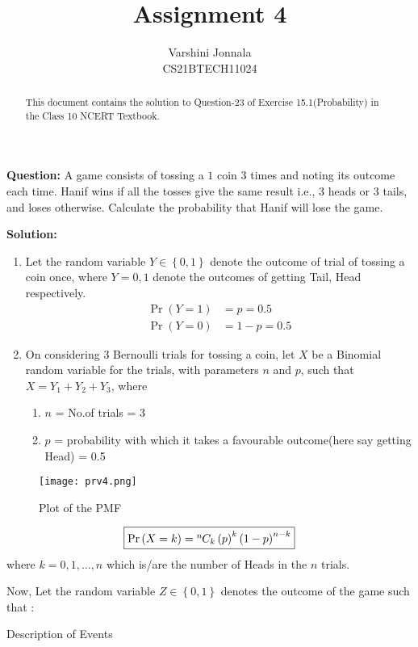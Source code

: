 \documentclass[journal,12pt,twocolumn]{IEEEtran}
\title{Assignment 4}
\author{Varshini Jonnala\\CS21BTECH11024}
\providecommand{\pr}[1]{\ensuremath{\Pr\left(#1\right)}}
\providecommand{\brak}[1]{\ensuremath{\left(#1\right)}}
\providecommand{\cbrak}[1]{\ensuremath{\left\{#1\right\}}}
\newcommand*{\permcomb}[4][0mu]{{{}^{#3}\mkern#1#2_{#4}}}
\newcommand*{\comb}[1][-1mu]{\permcomb[#1]{C}}
\newcommand{\solution}{\noindent \textbf{Solution: }}
\begin{document}
    \maketitle
    \begin{abstract}
    This document contains the solution to Question-23 of Exercise 15.1(Probability) in the Class 10 NCERT Textbook.  
    \end{abstract}
    
    \noindent \textbf{Question: } A game consists of tossing a \rupee$1$ coin $3$ times and noting its outcome each time. Hanif wins if all the tosses give the same result i.e., $3$ heads or $3$ tails, and loses otherwise. Calculate the probability that Hanif will lose the game.
    
    \solution
    
    \begin{enumerate}
         \item Let the random variable $Y\in \cbrak{0,1}$  denote the outcome of trial of tossing a coin once, where $Y = 0,1$ denote the outcomes of getting Tail, Head respectively.
	\begin{align}
		\pr{Y=1} &= p = 0.5\\
		\pr{Y=0} &= 1-p = 0.5
	\end{align}
        \item On considering $3$ Bernoulli trials for tossing a coin, let $X$ be a Binomial random variable for the trials, with parameters $n$ and $p$, such that $X = Y_1 + Y_2 + Y_3$, where
    \begin{enumerate}
		\item $n$ = No.of trials = 3
		\item $p$ = probability with which it takes a favourable outcome(here say getting Head) = 0.5
	\end{enumerate}
	\end{enumerate}
	\begin{figure}[!ht]
	\centering
    \texttt{[image: prv4.png]}
    \caption{Plot of the PMF}
    \label{fig:fig-1}
    \end{figure}

	\begin{align}
	   \fbox{$\pr{X = k} = \comb{n}{k}\brak{p}^k\brak{1-p}^{n-k}$} \label{3}
	\end{align}
	where $k= 0,1,\dots, n$ which is/are the number of Heads in the $n$ trials.
    	
   Now, Let the random variable $Z \in \cbrak{0,1}$ denotes the outcome of the game such that : 
    \begin{table}[ht!]
        \centering
        
    	\caption{Description of Events}
    	\label{Tables:Table}
    \end{table}
    
\end{document}
